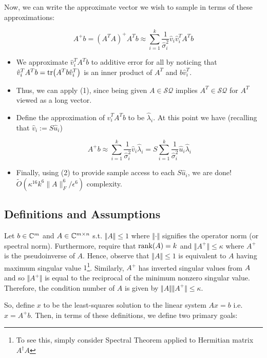 \documentclass[main.tex]{subfiles}
\begin{document}
Now, we can write the approximate vector we wish to sample in terms of these approximations:

$$A^+b = (A^TA)^+A^Tb \approx \sum_{i=1}^k \frac{1}{\hat{\sigma}_i^2}\hat{v}_i\hat{v}_i^T A^Tb$$

\begin{itemize}
\item We approximate $\hat{v}_i^TA^Tb$ to additive error for all by noticing that $\hat{v}_i^TA^Tb = \tr(A^Tb\hat{v}_i^T)$ is an inner product of $A^T$ and $b\hat{v}_i^T$. 
\item Thus, we can apply (1), since being given $A \in \mathcal{SQ}$ implies $A^T \in \mathcal{SQ}$ for $A^T$ viewed as a long vector. 
\item Define the approximation of $\hat{v}_i^TA^Tb$ to be $\hat{\lambda}_i$. At this point we have (recalling that $\hat{v}_i := S\hat{u}_i$)

$$A^+b \approx \sum_{i=1}^k \frac{1}{\hat{\sigma}_i^2}\hat{v}_i\hat{\lambda}_i = S \sum_{i=1}^k \frac{1}{\hat{\sigma}_i^2}\hat{u}_i\hat{\lambda}_i$$

\item Finally, using (2) to provide sample access to each $S \hat{u}_i$, we are done! $\tilde{O}(\kappa^{16}k^6 \|A\|^6_F / \epsilon^6)$ complexity.
\end{itemize}


\subsection{Definitions and Assumptions}

Let $b \in \mathbb{C}^m$ and $A \in \mathbb{C}^{m \times n}$ s.t. $\Vert A \Vert \leq 1$ where $\Vert \cdot \Vert$ signifies the operator norm (or spectral norm). Furthermore, require that $\rank(A) = k$ and $\Vert A^+ \Vert \leq \kappa$ where $A^+$ is the pseudoinverse of $A$. Hence, observe that $\Vert A \Vert \leq 1$ is equivalent to $A$ having maximum singular value $1$\footnote{To see this, simply consider Spectral Theorem applied to Hermitian matrix $A^\dag A$}. Similarly, $A^+$ has inverted singular values from $A$ and so $\Vert A^+ \Vert$ is equal to the reciprocal of the minimum nonzero singular value. Therefore, the condition number of $A$ is given by $\Vert A \Vert \Vert A^+ \Vert \leq \kappa$.

So, define $x$ to be the least-squares solution to the linear system $Ax = b$ i.e. $x = A^+ b$. Then, in terms of these definitions, we define two primary goals:
\end{document}
